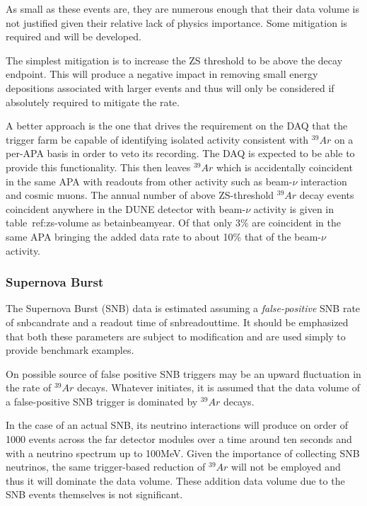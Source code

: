 As small as these events are, they are numerous enough that their data
volume is not justified given their relative lack of physics importance.
Some mitigation is required and will be developed.

The simplest mitigation is to increase the ZS threshold to be above
the decay endpoint.
This will produce a negative impact in removing small energy
depositions associated with larger events and thus will only be
considered if absolutely required to mitigate the rate.

A better approach is the one that drives the requirement on the DAQ
that the trigger farm be capable of identifying isolated activity
consistent with $^{39}Ar$ on a per-APA basis in order to veto its
recording.
The DAQ is expected to be able to provide this functionality.
This then leaves $^{39}Ar$ which is accidentally coincident in the
same APA with readouts from other activity such as beam-$\nu$
interaction and cosmic muons.
The annual number of above ZS-threshold $^{39}Ar$ decay events
coincident anywhere in the DUNE detector with beam-$\nu$ activity is
given in table~{ref:zs-volume} as betainbeamyear.
Of that only 3\% are coincident in the same APA bringing the added
data rate to about 10\% that of the beam-$\nu$ activity.

\subsubsection{Supernova Burst}

The Supernova Burst (SNB) data is estimated assuming a
\textit{false-positive} SNB rate of snbcandrate and a readout time of
snbreadouttime.
It should be emphasized that both these parameters are subject to
modification and are used simply to provide benchmark examples.

On possible source of false positive SNB triggers may be an upward
fluctuation in the rate of $^{39}Ar$ decays.
Whatever initiates, it is assumed that the data volume of a
false-positive SNB trigger is dominated by $^{39}Ar$ decays.

In the case of an actual SNB, its neutrino interactions will produce
on order of 1000 events across the far detector modules over a time
around ten seconds and with a neutrino spectrum up to 100MeV.
Given the importance of collecting SNB neutrinos, the same
trigger-based reduction of $^{39}Ar$ will not be employed and thus it
will dominate the data volume.
These addition data volume due to the SNB events themselves is not
significant.

